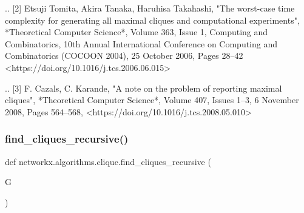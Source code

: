 \begin{DoxyVerb}
.. [2] Etsuji Tomita, Akira Tanaka, Haruhisa Takahashi,
   "The worst-case time complexity for generating all maximal
   cliques and computational experiments",
   *Theoretical Computer Science*, Volume 363, Issue 1,
   Computing and Combinatorics,
   10th Annual International Conference on
   Computing and Combinatorics (COCOON 2004), 25 October 2006, Pages 28--42
   <https://doi.org/10.1016/j.tcs.2006.06.015>

.. [3] F. Cazals, C. Karande,
   "A note on the problem of reporting maximal cliques",
   *Theoretical Computer Science*,
   Volume 407, Issues 1--3, 6 November 2008, Pages 564--568,
   <https://doi.org/10.1016/j.tcs.2008.05.010>\end{DoxyVerb}
 \mbox{\label{namespacenetworkx_1_1algorithms_1_1clique_a0ae8791cb3fbabc4195e5e1bf11b66c3}} 
\subsubsection{\texorpdfstring{find\+\_\+cliques\+\_\+recursive()}{find\_cliques\_recursive()}}
{\footnotesize\ttfamily def networkx.\+algorithms.\+clique.\+find\+\_\+cliques\+\_\+recursive (\begin{DoxyParamCaption}\item[{}]{G }\end{DoxyParamCaption})}

